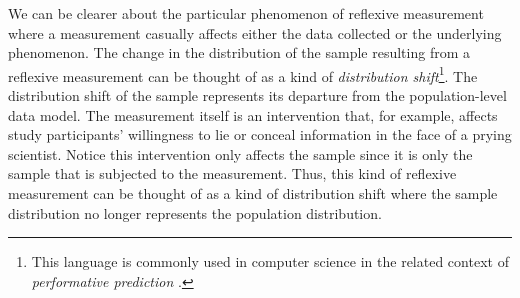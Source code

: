


We can be clearer about the particular phenomenon of reflexive measurement where a measurement casually affects either the data collected or the underlying phenomenon. The change in the distribution of the sample resulting from a reflexive measurement can be thought of as a kind of \textit{distribution shift}\footnote{This language is commonly used in computer science in the related context of \textit{performative prediction} \autocite{perdomo2020}.}. The distribution shift of the sample represents its departure from the population-level data model. The measurement itself is an intervention that, for example, affects study participants' willingness to lie or conceal information in the face of a prying scientist. Notice this intervention only affects the sample since it is only the sample that is subjected to the measurement. Thus, this kind of reflexive measurement can be thought of as a kind of distribution shift where the sample distribution no longer represents the population distribution. 

